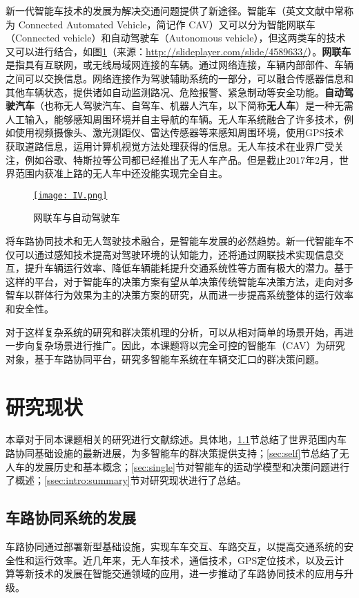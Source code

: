新一代智能车技术的发展为解决交通问题提供了新途径。智能车（英文文献中常称为 Connected Automated Vehicle，简记作 CAV）又可以分为智能网联车（Connected vehicle）和自动驾驶车（Autonomous vehicle），但这两类车的技术又可以进行结合，如图\ref{fig:IV}（来源：\url{http://slideplayer.com/slide/4589633/}）。\textbf{网联车} 是指具有互联网，或无线局域网连接的车辆。通过网络连接，车辆内部部件、车辆之间可以交换信息。网络连接作为驾驶辅助系统的一部分，可以融合传感器信息和其他车辆状态，提供诸如自动监测路况、危险报警、紧急制动等安全功能\cite{connected2017}。\textbf{自动驾驶汽车}（也称无人驾驶汽车、自驾车、机器人汽车\cite{Thrun2010Toward}，以下简称\textbf{无人车}）是一种无需人工输入，能够感知周围环境并自主导航的车辆。无人车系统融合了许多技术，例如使用视频摄像头、激光测距仪、雷达传感器等来感知周围环境，使用GPS技术获取道路信息，运用计算机视觉方法处理获得的信息。无人车技术在业界广受关注，例如谷歌\cite{google2017self}、特斯拉\cite{tesla2017model}等公司都已经推出了无人车产品。但是截止2017年2月，世界范围内获准上路的无人车中还没能实现完全自主。

\begin{figure}
\centering
\href{http://slideplayer.com/slide/4589633/}{\texttt{[image: IV.png]}}
\caption{网联车与自动驾驶车}
\label{fig:IV}
\end{figure}

将车路协同技术和无人驾驶技术融合，是智能车发展的必然趋势。新一代智能车不仅可以通过感知技术提高对驾驶环境的认知能力，还将通过网联技术实现信息交互，提升车辆运行效率、降低车辆能耗提升交通系统性等方面有极大的潜力。基于这样的平台，对于智能车的决策方案有望从单决策传统智能车决策方法，走向对多智车以群体行为效果为主的决策方案的研究，从而进一步提高系统整体的运行效率和安全性。

对于这样复杂系统的研究和群决策机理的分析，可以从相对简单的场景开始，再进一步向复杂场景进行推广。因此，本课题将以完全可控的智能车（CAV）为研究对象，基于车路协同平台，研究多智能车系统在车辆交汇口的群决策问题。

\section{研究现状}
本章对于同本课题相关的研究进行文献综述。具体地，\ref{sec:VIC}节总结了世界范围内车路协同基础设施的最新进展，为多智能车的群决策提供支持；\ref{sec:self}节总结了无人车的发展历史和基本概念；\ref{sec:single}节对智能车的运动学模型和决策问题进行了概述；\ref{ssec:intro:summary}节对研究现状进行了总结。

\subsection{车路协同系统的发展}
\label{sec:VIC}
车路协同通过部署新型基础设施，实现车车交互、车路交互，以提高交通系统的安全性和运行效率。近几年来，无人车技术，通信技术，GPS定位技术，以及云计算等新技术的发展在智能交通领域的应用，进一步推动了车路协同技术的应用与升级。

